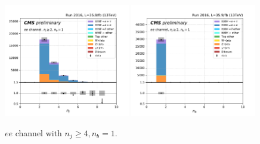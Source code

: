\begin{figure}[ht]
    \includegraphics[width=0.49\textwidth]{chapters/Appendix/sectionPlots/figures/kinematics_pickles/ee/1b/ee_1b_nJets.pdf}
    \includegraphics[width=0.49\textwidth]{chapters/Appendix/sectionPlots/figures/kinematics_pickles/ee/1b/ee_1b_nBJets.pdf}
    
    \caption{$ee$ channel with $n_j\geq4, n_b=1$.}
\end{figure}

